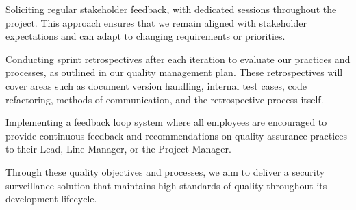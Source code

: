 Soliciting regular stakeholder feedback, with dedicated sessions throughout the project. This approach ensures that we remain aligned with stakeholder expectations and can adapt to changing requirements or priorities.

Conducting sprint retrospectives after each iteration to evaluate our practices and processes, as outlined in our quality management plan. These retrospectives will cover areas such as document version handling, internal test cases, code refactoring, methods of communication, and the retrospective process itself.

Implementing a feedback loop system where all employees are encouraged to provide continuous feedback and recommendations on quality assurance practices to their Lead, Line Manager, or the Project Manager.

Through these quality objectives and processes, we aim to deliver a security surveillance solution that maintains high standards of quality throughout its development lifecycle.